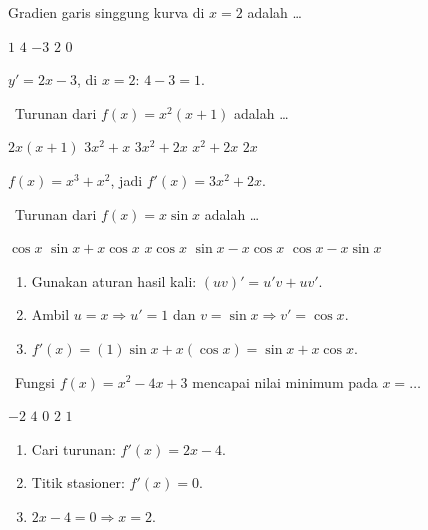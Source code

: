 \documentclass[11pt,a4paper]{exam}
\newenvironment{langkah}{%
  \begin{enumerate}[label=\textbf{Langkah \arabic*:},leftmargin=2.6em,
    itemsep=2pt,topsep=2pt]}{\end{enumerate}}
\newcommand{\Inter}{{\footnotesize\textsf{\textcolor{biru}{[Intermediate]}}}\ }
\newcommand{\Adv}{{\footnotesize\textsf{\textcolor{oranye}{[Advanced]}}}\ }
\begin{document}
\begin{questions}
Gradien garis singgung kurva di $x=2$ adalah \dots
\begin{choices}
\CorrectChoice $1$ \choice $4$ \choice $-3$ \choice $2$ \choice $0$
\end{choices}
\begin{solution}$y' = 2x-3$, di $x=2$: $4-3 = 1.$\end{solution}

\question \Inter Turunan dari $f(x) = x^{2}(x+1)$ adalah \dots
\begin{choices}
\choice $2x(x+1)$ \choice $3x^{2}+x$ \CorrectChoice $3x^{2}+2x$ \choice $x^{2}+2x$ \choice $2x$
\end{choices}
\begin{solution}$f(x) = x^{3}+x^{2}$, jadi $f'(x) = 3x^{2}+2x.$\end{solution}

\question \Adv Turunan dari $f(x) = x\sin x$ adalah \dots
\begin{choices}
\choice $\cos x$ \CorrectChoice $\sin x + x\cos x$ \choice $x\cos x$
\choice $\sin x - x\cos x$ \choice $\cos x - x\sin x$
\end{choices}
\begin{solution}
\begin{langkah}
\item Gunakan aturan hasil kali: $(uv)' = u'v + uv'$.
\item Ambil $u=x \Rightarrow u'=1$ dan $v=\sin x \Rightarrow v'=\cos x$.
\item $f'(x) = (1)\sin x + x(\cos x) = \sin x + x\cos x$.
\end{langkah}
\end{solution}

\question \Adv Fungsi $f(x) = x^{2} - 4x + 3$ mencapai nilai minimum pada $x = \dots$
\begin{choices}
\choice $-2$ \choice $4$ \choice $0$ \CorrectChoice $2$ \choice $1$
\end{choices}
\begin{solution}
\begin{langkah}
\item Cari turunan: $f'(x) = 2x - 4$.
\item Titik stasioner: $f'(x) = 0$.
\item $2x - 4 = 0 \Rightarrow x = 2$.
\end{langkah}
\end{solution}


\end{questions}
\end{document}
